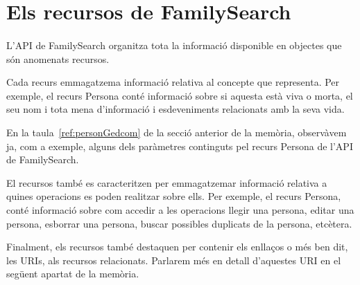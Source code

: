 \section{Els recursos de FamilySearch}

    \paragraph{}
    L'API de FamilySearch organitza tota la informació disponible en objectes que són anomenats recursos.

    Cada recurs emmagatzema informació relativa al concepte que representa. Per exemple, el recurs Persona conté informació sobre si aquesta està viva o morta, el seu nom i tota mena d'informació i esdeveniments relacionats amb la seva vida.

    En la taula~\ref{ref:personGedcom} de la secció anterior de la memòria, observàvem ja, com a exemple, alguns dels paràmetres continguts pel recurs Persona de l'API de FamilySearch.

    El recursos també es caracteritzen per emmagatzemar informació relativa a quines operacions es poden realitzar sobre ells. Per exemple, el recurs Persona, conté informació sobre com accedir a les operacions llegir una persona, editar una persona, esborrar una persona, buscar possibles duplicats de la persona, etcètera.

    Finalment, els recursos també destaquen per contenir els enllaços o més ben dit, les URIs, als recursos relacionats. Parlarem més en detall d’aquestes URI en el següent apartat de la memòria.
